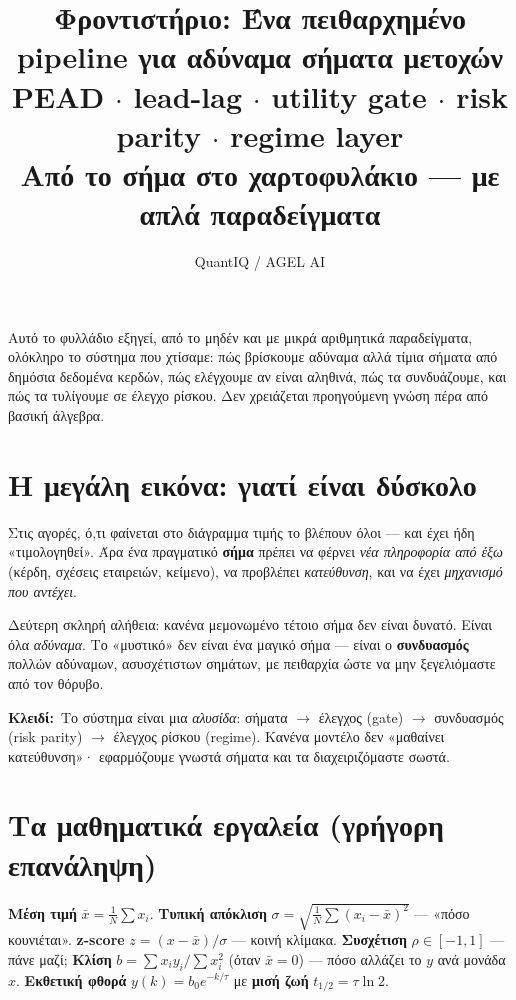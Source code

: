 \documentclass[11pt]{article}
\title{\textbf{Φροντιστήριο: Ένα πειθαρχημένο pipeline για αδύναμα σήματα μετοχών}\\[3pt]
\large PEAD $\cdot$ lead-lag $\cdot$ utility gate $\cdot$ risk parity $\cdot$ regime layer\\[-1pt]
\normalsize\textcolor{accent}{Από το σήμα στο χαρτοφυλάκιο — με απλά παραδείγματα}}
\author{QuantIQ / AGEL AI}\date{}
\newcommand{\key}[1]{\par\medskip\noindent\colorbox{soft}{\parbox{\dimexpr\linewidth-2\fboxsep}{\textcolor{accent}{\textbf{Κλειδί:}}\ #1}}\par\medskip}
\begin{document}
\maketitle\thispagestyle{empty}

\noindent Αυτό το φυλλάδιο εξηγεί, από το μηδέν και με μικρά αριθμητικά παραδείγματα, ολόκληρο
το σύστημα που χτίσαμε: πώς βρίσκουμε αδύναμα αλλά τίμια σήματα από δημόσια δεδομένα κερδών,
πώς ελέγχουμε αν είναι αληθινά, πώς τα συνδυάζουμε, και πώς τα τυλίγουμε σε έλεγχο ρίσκου.
Δεν χρειάζεται προηγούμενη γνώση πέρα από βασική άλγεβρα.

\tableofcontents
\bigskip

\section{Η μεγάλη εικόνα: γιατί είναι δύσκολο}

Στις αγορές, ό,τι φαίνεται στο διάγραμμα τιμής το βλέπουν όλοι — και έχει ήδη «τιμολογηθεί».
Άρα ένα πραγματικό \textbf{σήμα} πρέπει να φέρνει \emph{νέα πληροφορία από έξω} (κέρδη, σχέσεις
εταιρειών, κείμενο), να προβλέπει \emph{κατεύθυνση}, και να έχει \emph{μηχανισμό που αντέχει}.

Δεύτερη σκληρή αλήθεια: κανένα μεμονωμένο τέτοιο σήμα δεν είναι δυνατό. Είναι όλα \emph{αδύναμα}.
Το «μυστικό» δεν είναι ένα μαγικό σήμα — είναι ο \textbf{συνδυασμός} πολλών αδύναμων,
ασυσχέτιστων σημάτων, με πειθαρχία ώστε να μην ξεγελιόμαστε από τον θόρυβο.

\key{Το σύστημα είναι μια \emph{αλυσίδα}: σήματα $\rightarrow$ έλεγχος (gate) $\rightarrow$
συνδυασμός (risk parity) $\rightarrow$ έλεγχος ρίσκου (regime). Κανένα μοντέλο δεν «μαθαίνει
κατεύθυνση»· εφαρμόζουμε γνωστά σήματα και τα διαχειριζόμαστε σωστά.}

\section{Τα μαθηματικά εργαλεία (γρήγορη επανάληψη)}

\textbf{Μέση τιμή} $\bar{x}=\frac{1}{N}\sum x_i$. \textbf{Τυπική απόκλιση}
$\sigma=\sqrt{\frac1N\sum(x_i-\bar{x})^2}$ — «πόσο κουνιέται». \textbf{z-score} $z=(x-\bar{x})/\sigma$
— κοινή κλίμακα. \textbf{Συσχέτιση} $\rho\in[-1,1]$ — πάνε μαζί; \textbf{Κλίση} $b=\sum x_iy_i/\sum x_i^2$
(όταν $\bar{x}=0$) — πόσο αλλάζει το $y$ ανά μονάδα $x$. \textbf{Εκθετική φθορά}
$y(k)=b_0e^{-k/\tau}$ με \textbf{μισή ζωή} $t_{1/2}=\tau\ln2$.
\end{document}
